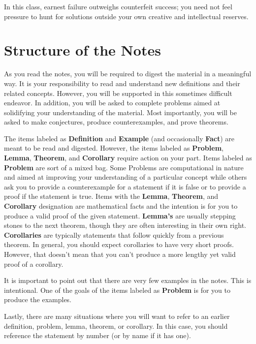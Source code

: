 In this class, earnest failure outweighs counterfeit success; you need not feel pressure to hunt for solutions outside your own creative and intellectual reserves.  

\section{Structure of the Notes}
As you read the notes, you will be required to digest the material in a meaningful way.  It is your responsibility to read and understand new definitions and their related concepts.  However, you will be supported in this sometimes difficult endeavor. In addition, you will be asked to complete problems aimed at solidifying your understanding of the material.  Most importantly, you will be asked to make conjectures, produce counterexamples, and prove theorems.

The items labeled as \textbf{Definition} and \textbf{Example} (and occasionally \textbf{Fact}) are meant to be read and digested.  However, the items labeled as \textbf{Problem}, \textbf{Lemma}, \textbf{Theorem}, and \textbf{Corollary} require action on your part.  Items labeled as \textbf{Problem} are sort of a mixed bag. Some Problems are computational in nature and aimed at improving your understanding of a particular concept while others ask you to provide a counterexample for a statement if it is false or to provide a proof if the statement is true. Items with the \textbf{Lemma}, \textbf{Theorem}, and \textbf{Corollary} designation are mathematical facts and the intention is for you to produce a valid proof of the given statement.  \textbf{Lemma's} are usually stepping stones to the next theorem, though they are often  interesting in their own right. \textbf{Corollaries}  are typically statements that follow quickly from a previous theorem. In general, you should expect corollaries to have very short proofs.  However, that doesn't mean that you can't produce a more lengthy yet valid proof of a corollary. 

It is important to point out that there are very few examples in the notes.  This is intentional.  One of the goals of the items labeled as \textbf{Problem} is for you to produce the examples.

Lastly, there are many situations where you will want to refer to an earlier definition, problem, lemma, theorem, or corollary.  In this case, you should reference the statement by number (or by name if it has one).  
